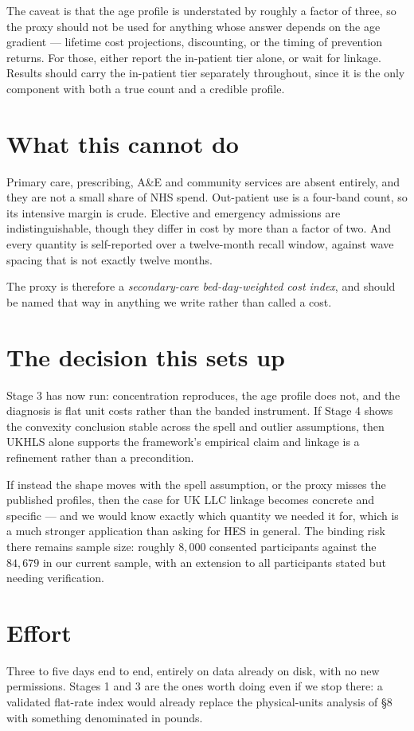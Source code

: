 \documentclass[11pt]{article}
\begin{document}
The caveat is that the age profile is understated by roughly a factor of
three, so the proxy should not be used for anything whose answer depends on
the age gradient --- lifetime cost projections, discounting, or the timing of
prevention returns. For those, either report the in-patient tier alone, or
wait for linkage. Results should carry the in-patient tier separately
throughout, since it is the only component with both a true count and a
credible profile.

\section{What this cannot do}

Primary care, prescribing, A\&E and community services are absent entirely,
and they are not a small share of NHS spend. Out-patient use is a four-band
count, so its intensive margin is crude. Elective and emergency admissions
are indistinguishable, though they differ in cost by more than a factor of
two. And every quantity is self-reported over a twelve-month recall window,
against wave spacing that is not exactly twelve months.

The proxy is therefore a \emph{secondary-care bed-day-weighted cost index},
and should be named that way in anything we write rather than called a cost.

\section{The decision this sets up}

Stage 3 has now run: concentration reproduces, the age profile does not,
and the diagnosis is flat unit costs rather than the banded instrument. If
Stage 4 shows the convexity conclusion stable across the
spell and outlier assumptions, then UKHLS alone supports the framework's
empirical claim and linkage is a refinement rather than a precondition.

If instead the shape moves with the spell assumption, or the proxy misses
the published profiles, then the case for UK LLC linkage becomes concrete
and specific --- and we would know exactly which quantity we needed it for,
which is a much stronger application than asking for HES in general. The
binding risk there remains sample size: roughly $8{,}000$ consented
participants against the $84{,}679$ in our current sample, with an extension
to all participants stated but needing verification.

\section*{Effort}

Three to five days end to end, entirely on data already on disk, with no new
permissions. Stages 1 and 3 are the ones worth doing even if we stop there:
a validated flat-rate index would already replace the physical-units analysis
of \S8 with something denominated in pounds.
\end{document}
